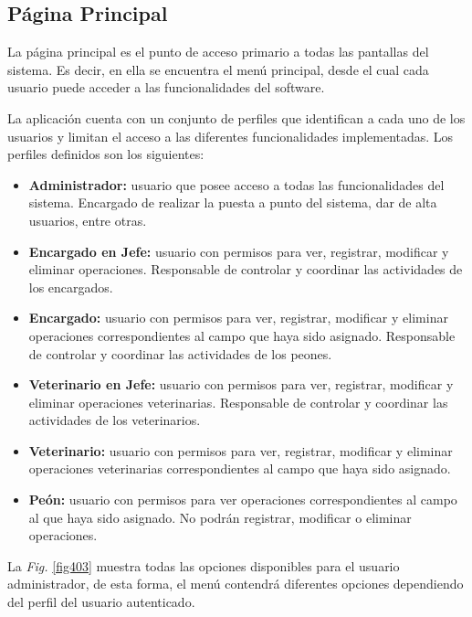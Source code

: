 \documentclass[11pt,oneside]{book}
\begin{document}
\newpage
\subsection{Página Principal}
La página principal es el punto de acceso primario a todas las pantallas del sistema. Es decir, en ella se encuentra el menú principal, desde el cual cada usuario puede acceder a las funcionalidades del software. 

La aplicación cuenta con un conjunto de perfiles que identifican a cada uno de los usuarios y limitan el acceso a las diferentes funcionalidades implementadas. Los perfiles definidos son los siguientes:
\begin{itemize}
\item \textbf{Administrador:} usuario que posee acceso a todas las funcionalidades del sistema. Encargado de realizar la puesta a punto del sistema, dar de alta usuarios, entre otras.
\item \textbf{Encargado en Jefe:} usuario con permisos para ver, registrar, modificar y eliminar operaciones. Responsable de controlar y coordinar las actividades de los encargados.
\item \textbf{Encargado:} usuario con permisos para ver, registrar, modificar y eliminar operaciones correspondientes al campo que haya sido asignado. Responsable de controlar y coordinar las actividades de los peones.
\item \textbf{Veterinario en Jefe:} usuario con permisos para ver, registrar, modificar y eliminar operaciones veterinarias. Responsable de controlar y coordinar las actividades de los veterinarios.
\item \textbf{Veterinario:} usuario con permisos para ver, registrar, modificar y eliminar operaciones veterinarias correspondientes al campo que haya sido asignado.
\item \textbf{Peón:} usuario con permisos para ver operaciones correspondientes al campo al que haya sido asignado. No podrán registrar, modificar o eliminar operaciones.
\end{itemize}

La \textit{Fig.} \eqref{fig403} muestra todas las opciones disponibles para el usuario administrador, de esta forma, el menú contendrá diferentes opciones dependiendo del perfil del usuario autenticado. 
\end{document}
